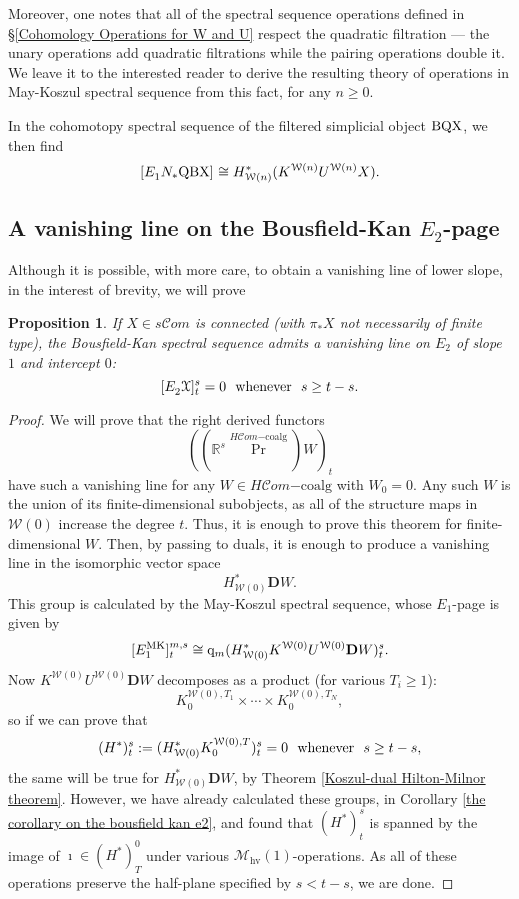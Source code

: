 \documentclass[11pt]{amsart} \renewcommand{\baselinestretch}{1.4}
\theoremstyle{plain}
\newtheorem{prop}[thm]{Proposition}
\theoremstyle{definition}
\DeclareMathOperator{\Prim}{Pr}
\newcommand{\scrC}{\mathscr{C}}
\newcommand{\calX}{\mathcal{X}}
\newcommand{\calw}{\mathcal{W}}
\newcommand{\calx}{\mathcal{X}}
\newcommand{\calMhv}{\mathcal{M}_\mathrm{hv}}
\newcommand{\HC}[1]{H#1\mathrm{-coalg}}
\newcommand{\quadgrad}[1]{\mathrm{q}_{#1}}
\newcommand{\algs}{{\scrC\!\textit{om}}}
\newcommand{\E}[5]{[E^{#1}_{#2}#3]^{#4}_{#5}}
\newcommand{\dual}{\mathbf{D}}
\begin{document}
\begin{May sseq and vanishing line}
Moreover, one notes that all of the spectral sequence operations defined in \S\ref{Cohomology Operations for W and U} respect the quadratic filtration --- the unary operations add quadratic filtrations while the pairing operations double it. We leave it to the interested reader to derive the resulting theory of operations in May-Koszul spectral sequence from this fact, for any $n\geq0$.

In the cohomotopy spectral sequence of the filtered simplicial object $\textup{BQX}$, we then find
\[\E{}{1}{N_*\textup{QBX}}{}{}\cong H^*_{\calw(n)}(K^{\calw(n)}U^{\calw(n)}X).\]

\subsection{A vanishing line on the Bousfield-Kan $E_2$-page}
\label{A vanishing line on the Bousfield-Kan}
Although it is possible, with more care, to obtain a vanishing line of lower slope, in the interest of brevity, we will prove
\begin{prop}
If $X\in s\algs$ is connected (with $\pi_*X$ not necessarily of finite type), the Bousfield-Kan spectral sequence admits a vanishing line on $E_2$ of slope $1$ and intercept $0$:
\[\E{}{2}{\calx}{s}{t}=0\textup{ \ whenever \ }s\geq t-s.\]
\end{prop}
\begin{proof}
We will prove that the right derived functors
\[((\mathbb{R}^s\Prim^{\HC{\algs}})W)_t\]
have such a vanishing line for any $W\in \HC{\algs}$ with $W_0=0$. Any such $W$ is the union of its finite-dimensional subobjects, as all of the structure maps in $\calw(0)$ increase the degree $t$. Thus, it is enough to prove this theorem for finite-dimensional $W$. Then, by passing to duals, it is enough to produce a vanishing line in the isomorphic vector space
\[H^*_{\calw(0)}\dual W.\]
This group is calculated by the May-Koszul spectral sequence, whose $E_1$-page is given by
\[\E{\textup{MK}}{1}{}{m,s}{t}\cong \quadgrad{m}(H^*_{\calw(0)}K^{\calw(0)}U^{\calw(0)}\dual W)^{s}_{t}.\]
Now $K^{\calw(0)}U^{\calw(0)}\dual W$ decomposes as a product (for various $T_i\geq1$):
\[K_{0}^{\calw(0),T_1}\times\cdots \times K_{0}^{\calw(0),T_N},\]
so if we can prove that
\[(H^*)^s_t:=(H^{*}_{\calw(0)}K_0^{\calw(0),T})^s_t=0 \textup{ \ whenever \ }s\geq t-s,\]
the same will be true for $H^*_{\calw(0)}\dual W$, by Theorem \ref{Koszul-dual Hilton-Milnor theorem}. %
However, we have already calculated these groups, in Corollary \ref{the corollary on the bousfield kan e2}, and found that $(H^*)^s_t$ is spanned by the image of $\imath\in (H^*)^0_T$ under various $\calMhv(1)$-operations. As all of these operations preserve the half-plane specified by $s<t-s$, we are done.
\end{proof}


\end{May sseq and vanishing line}
\end{document}

